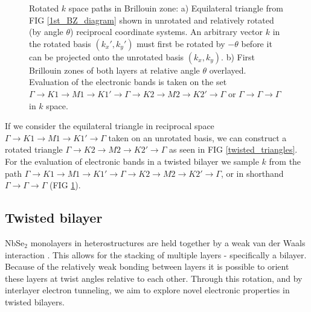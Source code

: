 \documentclass[12pt]{report} %
\begin{document}
\begin{figure}[ht!]
\begin{subfigure}[t]{0.475\textwidth}
    \caption{
    }
    \label{heterostructure_BZ_path}
  \end{subfigure}
  \caption{
    Rotated $k$ space paths in Brillouin zone: a) Equilateral triangle from FIG \ref{1st_BZ_diagram} shown in unrotated and relatively rotated (by angle $\theta$) reciprocal coordinate systems. An arbitrary vector $k$ in the rotated basis $(k_x', k_y')$ must first be rotated by $-\theta$ before it can be projected onto the unrotated basis $(k_x, k_y)$. b) First Brillouin zones of both layers at relative angle $\theta$ overlayed. Evaluation of the electronic bands is taken on the set $\Gamma \rightarrow K1 \rightarrow M1 \rightarrow K1' \rightarrow \Gamma \rightarrow K2 \rightarrow M2 \rightarrow K2' \rightarrow \Gamma$ or $\Gamma \rightarrow \Gamma \rightarrow \Gamma$ in $k$ space.
    \label{BZ_triangles}
  }
\end{figure}

  If we consider the equilateral triangle in reciprocal space $\Gamma \rightarrow K1 \rightarrow M1 \rightarrow K1' \rightarrow \Gamma$ taken on an unrotated basis, we can construct a rotated triangle $\Gamma \rightarrow K2 \rightarrow M2 \rightarrow K2' \rightarrow \Gamma$ as seen in FIG \ref{twisted_triangles}. For the evaluation of electronic bands in a twisted bilayer we sample $k$ from the path $\Gamma \rightarrow K1 \rightarrow M1 \rightarrow K1' \rightarrow \Gamma \rightarrow K2 \rightarrow M2 \rightarrow K2' \rightarrow \Gamma$, or in shorthand $\Gamma \rightarrow \Gamma \rightarrow \Gamma$ (FIG \ref{heterostructure_BZ_path}).

\subsection*{Twisted bilayer}

  NbSe$_2$ monolayers in heterostructures are held together by a weak van der Waals interaction \cite{Geim2013}. This allows for the stacking of multiple layers - specifically a bilayer. Because of the relatively weak bonding between layers it is possible to orient these layers at twist angles relative to each other. Through this rotation, and by interlayer electron tunneling, we aim to explore novel electronic properties in twisted bilayers.
\end{document}
